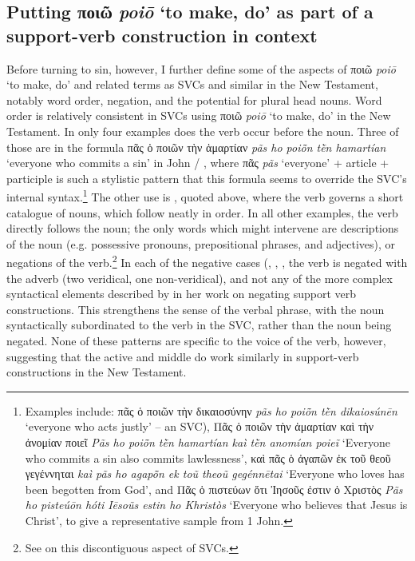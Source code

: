 \documentclass[output=paper,colorlinks,citecolor=brown]{langscibook}
\begin{document}
\subsection{Putting ποιῶ \textit{poiō} ‘to make, do' as part of a support-verb construction  in context}\label{putting-ux3c0ux3bfux3b9ux1ff6-as-part-of-an-svc-in-contextCR}

Before turning to sin, however, I further define some of the aspects of
ποιῶ \textit{poiō} ‘to make, do' and related terms as SVCs and similar in the New Testament, notably
word order, negation, and the potential for plural head nouns. 
Word
order is relatively consistent in SVCs using ποιῶ \textit{poiō} ‘to make, do' in the New Testament.
In only four examples does the verb occur before the noun. 
Three of
those are in the formula πᾶς ὁ ποιῶν τὴν ἁμαρτίαν \textit{pãs ho poiō̃n tḕn hamartían} ‘everyone who
commits a sin' in John / , where πᾶς \textit{pãs} ‘everyone' +
article + participle is such a stylistic pattern that this formula seems
to override the SVC's internal syntax.\footnote{Examples include:  πᾶς ὁ ποιῶν τὴν δικαιοσύνην \textit{pãs ho poiō̃n tḕn dikaiosúnēn} ‘everyone who acts justly' --
  an SVC),  Πᾶς ὁ ποιῶν τὴν ἁμαρτίαν καὶ τὴν ἀνομίαν ποιεῖ
  \textit{Pãs ho poiō̃n tḕn hamartían kaì tḕn anomían poieĩ} ‘Everyone who commits a sin also commits lawlessness',  καὶ πᾶς ὁ ἀγαπῶν ἐκ τοῦ θεοῦ γεγέννηται \textit{kaì pãs ho agapō̃n ek toũ theoũ gegénnētai} ‘Everyone who loves
  has been begotten from God', and  Πᾶς ὁ πιστεύων
  ὅτι Ἰησοῦς ἐστιν ὁ Χριστὸς \textit{Pãs ho pisteúōn
  hóti Iēsoũs estin ho Khristòs} ‘Everyone who believes that Jesus is
  Christ', to give a representative sample from 1 John.} 
  The
other use is , quoted above, where the verb governs a short
catalogue of nouns, which follow neatly in order. 
In all other examples,
the verb directly follows the noun; the only words which might intervene
are descriptions of the noun (e.g. possessive pronouns, prepositional
phrases, and adjectives), or negations of the verb.\footnote{See \citet[4] {fendel_i_2023} on this discontiguous aspect of SVCs.} In each of the negative
cases (, , , the verb is negated with
the adverb (two veridical, one non-veridical), and not any of the more
complex syntactical elements described by \citet[7–8]{fendel_i_2023} in her work on
negating support verb constructions. 
This
strengthens the sense of the verbal phrase, with the noun syntactically
subordinated to the verb in the SVC, rather than the noun being negated.
None of these patterns are specific to the voice of the verb, however,
suggesting that the active and middle do work similarly in support-verb
constructions in the New Testament.
\end{document}
